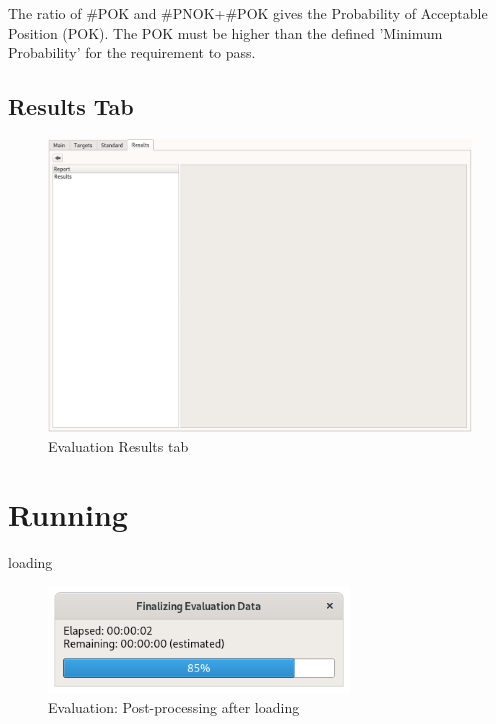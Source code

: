 The ratio of \#POK and \#PNOK+\#POK gives the Probability of Acceptable Position (POK). The POK must be higher than the defined 'Minimum Probability' for the requirement to pass.

\subsection{Results Tab}

\begin{figure}[H]
  \hspace*{-2cm}
    \includegraphics[width=18cm,frame]{../screenshots/eval_results_empty.png}
  \caption{Evaluation Results tab}
\end{figure}


\section{Running}
\label{sec:eval_run} 

loading

\begin{figure}[H]
  \centering 
    \includegraphics[width=8cm]{../screenshots/eval_post.png}
  \caption{Evaluation: Post-processing after loading}
\end{figure}

